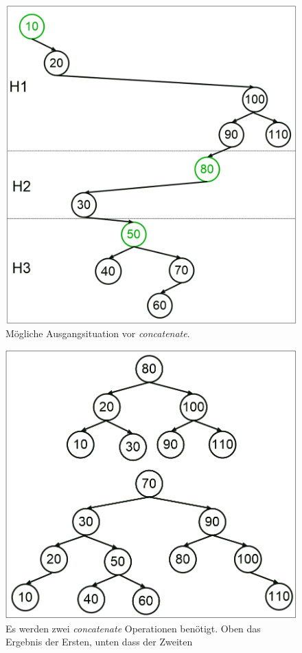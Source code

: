 \documentclass[a4paper,12pt]{article}
\begin{document}
 \begin{figure}[h]
	\centering
	\includegraphics[height= 0.5\textwidth]{"Medien/Zipper/hybrid/concatPfad"}
	\caption{Mögliche Ausgangsituation vor \textit{concatenate}.}
	\label{fig:concatPfad}
\end{figure} 
\begin{figure}[h]
	\centering
	\includegraphics[height= 0.5\textwidth]{"Medien/Zipper/hybrid/concatHybrid"}
	\caption{Es werden zwei  \textit{concatenate} Operationen benötigt. Oben das Ergebnis der Ersten, unten dass der Zweiten }
	\label{fig:concatHybrid}
\end{figure} 
\end{document}
